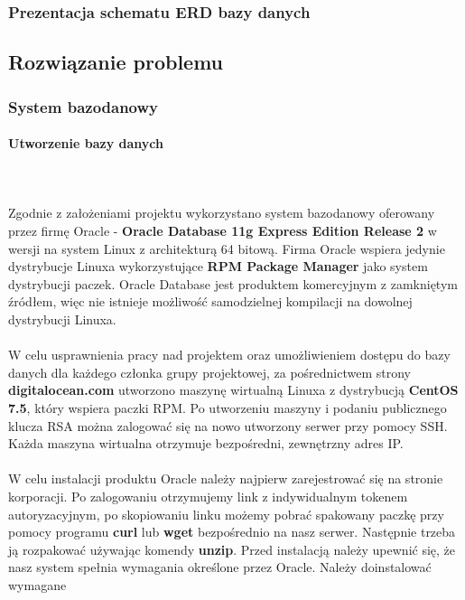 \documentclass[polish, 11pt]{article}
\begin{document}
	    \subsubsection{Prezentacja schematu ERD bazy danych}
		    

    \subsection{Rozwiązanie problemu}
	    \subsubsection{System bazodanowy}
		    \paragraph{Utworzenie bazy danych}\mbox{}\\\\
			    Zgodnie z założeniami projektu wykorzystano system bazodanowy oferowany przez firmę Oracle - 
			    {\bfseries Oracle Database 11g Express Edition Release 2} w wersji na system Linux z architekturą 64 bitową.
			    Firma Oracle wspiera jedynie dystrybucje Linuxa wykorzystujące {\bfseries RPM Package Manager} jako system dystrybucji paczek.
			    Oracle Database jest produktem komercyjnym z zamkniętym źródłem, więc nie istnieje możliwość samodzielnej kompilacji
			    na dowolnej dystrybucji Linuxa.\\\\
			    W celu usprawnienia pracy nad projektem oraz umożliwieniem dostępu do bazy danych dla każdego członka grupy projektowej,
			    za pośrednictwem strony {\bfseries digitalocean.com} utworzono maszynę wirtualną Linuxa z dystrybucją {\bfseries CentOS 7.5},
			    który wspiera paczki RPM. Po utworzeniu maszyny i podaniu publicznego klucza RSA można zalogować się na nowo utworzony serwer
			    przy pomocy SSH. Każda maszyna wirtualna otrzymuje bezpośredni, zewnętrzny adres IP.\\\\
			    W celu instalacji produktu Oracle należy najpierw zarejestrować się na stronie korporacji. Po zalogowaniu otrzymujemy link
			    z indywidualnym tokenem autoryzacyjnym, po skopiowaniu linku możemy pobrać spakowany paczkę przy pomocy programu 
			    {\bfseries curl} lub {\bfseries wget} bezpośrednio na nasz serwer. Następnie trzeba ją rozpakować używając komendy {\bfseries unzip}.
			    Przed instalacją należy upewnić się, że nasz system spełnia wymagania określone przez Oracle. Należy doinstalować wymagane
\end{document}
